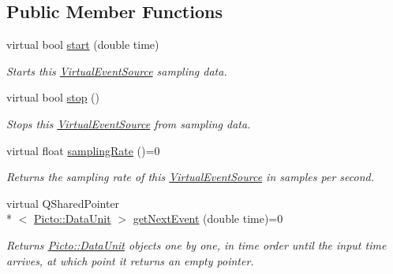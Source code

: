 \subsection*{Public Member Functions}
\begin{DoxyCompactItemize}
\item 
virtual bool \hyperlink{class_virtual_event_source_aacb8bafbdca11c995bd8496ce73f06c9}{start} (double time)
\begin{DoxyCompactList}\small\item\em Starts this \hyperlink{class_virtual_event_source}{Virtual\-Event\-Source} sampling data. \end{DoxyCompactList}\item 
virtual bool \hyperlink{class_virtual_event_source_abbd8656e089badcdc9de1616bfd2cd02}{stop} ()
\begin{DoxyCompactList}\small\item\em Stops this \hyperlink{class_virtual_event_source}{Virtual\-Event\-Source} from sampling data. \end{DoxyCompactList}\item 
\hypertarget{class_virtual_event_source_a56a9da8b395e419120159264a97c262d}{virtual float \hyperlink{class_virtual_event_source_a56a9da8b395e419120159264a97c262d}{sampling\-Rate} ()=0}\label{class_virtual_event_source_a56a9da8b395e419120159264a97c262d}

\begin{DoxyCompactList}\small\item\em Returns the sampling rate of this \hyperlink{class_virtual_event_source}{Virtual\-Event\-Source} in samples per second. \end{DoxyCompactList}\item 
\hypertarget{class_virtual_event_source_a474450ba3797f516d22ef652ab7d1a4a}{virtual Q\-Shared\-Pointer\\*
$<$ \hyperlink{class_picto_1_1_data_unit}{Picto\-::\-Data\-Unit} $>$ \hyperlink{class_virtual_event_source_a474450ba3797f516d22ef652ab7d1a4a}{get\-Next\-Event} (double time)=0}\label{class_virtual_event_source_a474450ba3797f516d22ef652ab7d1a4a}

\begin{DoxyCompactList}\small\item\em Returns \hyperlink{class_picto_1_1_data_unit}{Picto\-::\-Data\-Unit} objects one by one, in time order until the input time arrives, at which point it returns an empty pointer. \end{DoxyCompactList}\end{DoxyCompactItemize}
